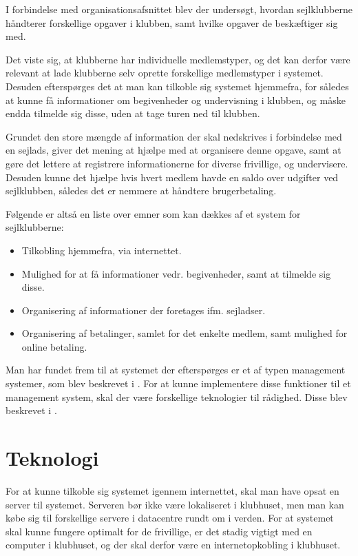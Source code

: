 I forbindelse med organisationsafsnittet blev der undersøgt, hvordan sejlklubberne håndterer forskellige
opgaver i klubben, samt hvilke opgaver de beskæftiger sig med.

Det viste sig, at klubberne har individuelle medlemstyper, og det kan derfor være relevant at lade klubberne
selv oprette forskellige medlemstyper i systemet. Desuden efterspørges det at man kan tilkoble sig systemet
hjemmefra, for således at kunne få informationer om begivenheder og undervisning i klubben, og måske endda
tilmelde sig disse, uden at tage turen ned til klubben.

Grundet den store mængde af information der skal nedskrives i forbindelse med en sejlads, giver det mening at
hjælpe med at organisere denne opgave, samt at gøre det lettere at registrere informationerne for diverse
frivillige, og undervisere. Desuden kunne det hjælpe hvis hvert medlem havde en saldo over udgifter ved sejlklubben, således
det er nemmere at håndtere brugerbetaling.

Følgende er altså en liste over emner som kan dækkes af et system for sejlklubberne:

\begin{itemize}
  \item Tilkobling hjemmefra, via internettet.
  \item Mulighed for at få informationer vedr. begivenheder, samt at tilmelde sig disse.
  \item Organisering af informationer der foretages ifm. sejladser.
  \item Organisering af betalinger, samlet for det enkelte medlem, samt mulighed for online betaling.
\end{itemize}

Man har fundet frem til at systemet der efterspørges er et af typen management systemer, som blev beskrevet i
. For at kunne implementere disse funktioner til et
management system, skal der være forskellige teknologier til rådighed. Disse blev beskrevet i
.


\section{Teknologi}

For at kunne tilkoble sig systemet igennem internettet, skal man have opsat en server til systemet. Serveren
bør ikke være lokaliseret i klubhuset, men man kan købe sig til forskellige servere i datacentre rundt om i
verden. For at systemet skal kunne fungere optimalt for de frivillige, er det stadig vigtigt med en computer i
klubhuset, og der skal derfor være en internetopkobling i klubhuset. 

